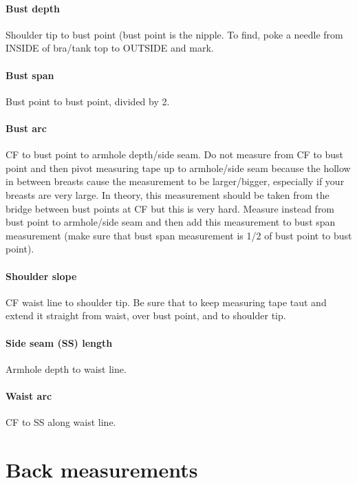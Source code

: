 \documentclass{article}
\begin{document}
\paragraph{Bust depth}
Shoulder tip to bust point (bust point is the nipple. To find, poke a needle from INSIDE of bra/tank top to OUTSIDE and mark.

\paragraph{Bust span}
Bust point to bust point, divided by 2.

\paragraph{Bust arc}
CF to bust point to armhole depth/side seam. Do not measure from CF to bust point and then pivot measuring tape up to armhole/side seam because the hollow in between breasts cause the measurement to be larger/bigger, especially if your breasts are very large. In theory, this measurement should be taken from the bridge between bust points at CF but this is very hard. Measure instead from bust point to armhole/side seam and then add this measurement to bust span measurement (make sure that bust span measurement is 1/2 of bust point to bust point).

\paragraph{Shoulder slope}
CF waist line to shoulder tip. Be sure that to keep measuring tape taut and extend it straight from waist, over bust point, and to shoulder tip.

\paragraph{Side seam (SS) length}
Armhole depth to waist line.

\paragraph{Waist arc}
CF to SS along waist line.


\section{Back measurements}
\end{document}
